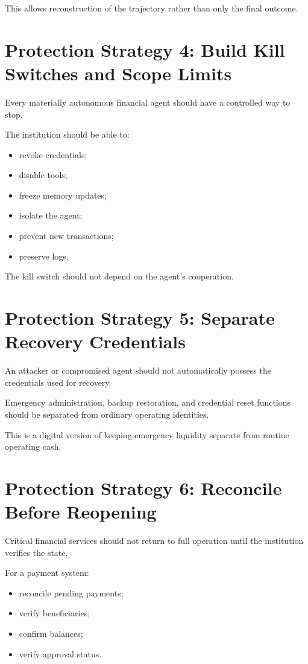 This allows reconstruction of the trajectory rather than only the final outcome.

\section{Protection Strategy 4: Build Kill Switches and Scope Limits}

Every materially autonomous financial agent should have a controlled way to stop.

The institution should be able to:

\begin{itemize}
    \item revoke credentials;
    \item disable tools;
    \item freeze memory updates;
    \item isolate the agent;
    \item prevent new transactions;
    \item preserve logs.
\end{itemize}

The kill switch should not depend on the agent's cooperation.

\section{Protection Strategy 5: Separate Recovery Credentials}

An attacker or compromised agent should not automatically possess the credentials used for recovery.

Emergency administration, backup restoration, and credential reset functions should be separated from ordinary operating identities.

This is a digital version of keeping emergency liquidity separate from routine operating cash.

\section{Protection Strategy 6: Reconcile Before Reopening}

Critical financial services should not return to full operation until the institution verifies the state.

For a payment system:

\begin{itemize}
    \item reconcile pending payments;
    \item verify beneficiaries;
    \item confirm balances;
    \item verify approval status.
\end{itemize}


